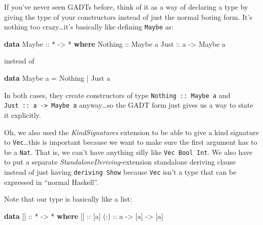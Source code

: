 \documentclass[]{article}
\newenvironment{Shaded}{\begin{snugshade}}{\end{snugshade}}
\newcommand{\DataTypeTok}[1]{\textcolor[rgb]{0.13,0.29,0.53}{#1}}
\newcommand{\FunctionTok}[1]{\textcolor[rgb]{0.00,0.00,0.00}{#1}}
\newcommand{\KeywordTok}[1]{\textcolor[rgb]{0.13,0.29,0.53}{\textbf{#1}}}
\newcommand{\NormalTok}[1]{#1}
\newcommand{\OtherTok}[1]{\textcolor[rgb]{0.56,0.35,0.01}{#1}}
\begin{document}
If you've never seen GADTs before, think of it as a way of declaring a type by
giving the type of your constructors instead of just the normal boring form.
It's nothing too crazy\ldots{}it's basically like defining \texttt{Maybe} as:

\begin{Shaded}
\begin{Highlighting}[]
\KeywordTok{data} \DataTypeTok{Maybe}\OtherTok{ ::} \FunctionTok{*} \OtherTok{->} \FunctionTok{*} \KeywordTok{where}
    \DataTypeTok{Nothing}\OtherTok{ ::} \DataTypeTok{Maybe}\NormalTok{ a}
    \DataTypeTok{Just}\OtherTok{    ::}\NormalTok{ a }\OtherTok{->} \DataTypeTok{Maybe}\NormalTok{ a}
\end{Highlighting}
\end{Shaded}

instead of

\begin{Shaded}
\begin{Highlighting}[]
\KeywordTok{data} \DataTypeTok{Maybe}\NormalTok{ a }\FunctionTok{=} \DataTypeTok{Nothing} \FunctionTok{|} \DataTypeTok{Just}\NormalTok{ a}
\end{Highlighting}
\end{Shaded}

In both cases, they create constructors of type \texttt{Nothing\ ::\ Maybe\ a}
and \texttt{Just\ ::\ a\ -\textgreater{}\ Maybe\ a} anyway\ldots{}so the GADT
form just gives us a way to state it explicitly.

Oh, we also used the \emph{KindSignatures} extension to be able to give a kind
signature to \texttt{Vec}\ldots{}this is important because we want to make sure
the first argument has to be a \texttt{Nat}. That is, we can't have anything
silly like \texttt{Vec\ Bool\ Int}. We also have to put a separate
\emph{StandaloneDeriving}-extension standalone deriving clause instead of just
having \texttt{deriving\ Show} because \texttt{Vec} isn't a type that can be
expressed in ``normal Haskell''.

Note that our type is basically like a list:

\begin{Shaded}
\begin{Highlighting}[]
\KeywordTok{data}\NormalTok{ []}\OtherTok{ ::} \FunctionTok{*} \OtherTok{->} \FunctionTok{*} \KeywordTok{where}
\NormalTok{    []}\OtherTok{  ::}\NormalTok{ [a]}
\OtherTok{    (:) ::}\NormalTok{ a }\OtherTok{->}\NormalTok{ [a] }\OtherTok{->}\NormalTok{ [a]}
\end{Highlighting}
\end{Shaded}
\end{document}
